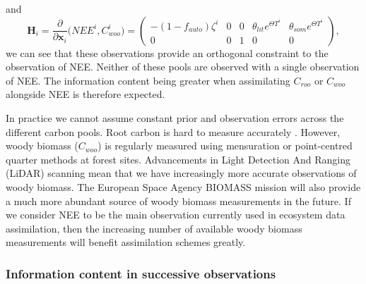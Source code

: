 and
\begin{equation}
\textbf{H}_{i} = \frac{\partial}{\partial \textbf{x}_{i}}\big(NEE^{i}, C_{woo}^{i} \big) =
 \begin{pmatrix}
-(1-f_{auto})\zeta^i & 0 & 0 & \theta_{lit} e^{\Theta T^{i}} & \theta_{som} e^{\Theta T^{i}}\\
0 & 0 & 1 & 0 & 0
\end{pmatrix},
\end{equation}
we can see that these observations provide an orthogonal constraint to the observation of NEE. Neither of these pools are observed with a single observation of NEE. The information content being greater when assimilating \(C_{roo}\) or \(C_{woo}\) alongside NEE is therefore expected. 

In practice we cannot assume constant prior and observation errors across the different carbon pools. Root carbon is hard to measure accurately \citep{brown2002measuring}. However, woody biomass (\(C_{woo}\)) is regularly measured using mensuration \citep{husch2002forest} or point-centred quarter methods \citep{dahdouh2006empirical} at forest sites. Advancements in Light Detection And Ranging (LiDAR) scanning \citep{Lefsky199983} mean that we have increasingly more accurate observations of woody biomass. The European Space Agency BIOMASS mission \citep{le2011biomass} will also provide a much more abundant source of woody biomass measurements in the future. If we consider NEE to be the main observation currently used in ecosystem data assimilation, then the increasing number of available woody biomass measurements will benefit assimilation schemes greatly.

\subsubsection{Information content in successive observations} \label{chap5:sec:D1_succ_obs}

